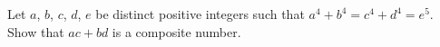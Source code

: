 Let $a$,  $b$,  $c$,  $d$,  $e$ be distinct positive integers such that $a^4+b^4=c^4+d^4=e^5$. Show that $ac+bd$ is a composite number.
